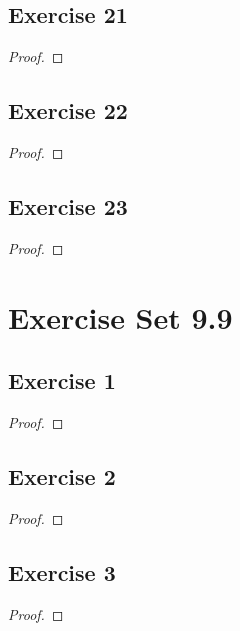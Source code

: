 \documentclass[14pt]{extarticle}
\begin{document}
\subsection{Exercise 21}

\begin{proof}

\end{proof}

\subsection{Exercise 22}

\begin{proof}

\end{proof}

\subsection{Exercise 23}

\begin{proof}

\end{proof}

\section{Exercise Set 9.9}

\subsection{Exercise 1}

\begin{proof}

\end{proof}

\subsection{Exercise 2}

\begin{proof}

\end{proof}

\subsection{Exercise 3}

\begin{proof}

\end{proof}
\end{document}
